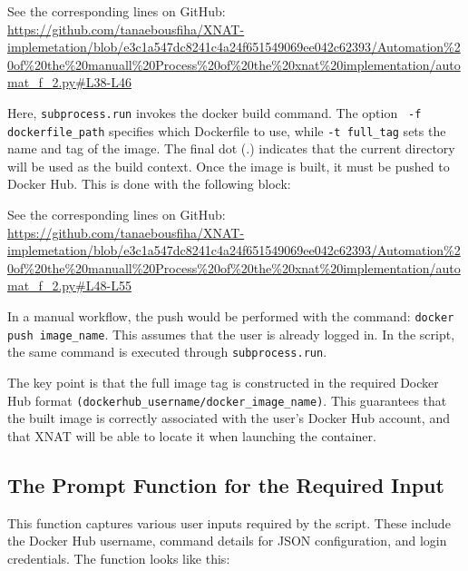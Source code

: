 

\noindent\footnotesize See the corresponding lines on GitHub:\url{ https://github.com/tanaebousfiha/XNAT-implemetation/blob/e3c1a547dc8241c4a24f651549069ee042c62393/Automation%20of%20the%20manuall%20Process%20of%20the%20xnat%20implementation/automat_f_2.py#L38-L46}







Here, \texttt{subprocess.run} invokes the docker build command. The option \texttt{ -f dockerfile\_path} specifies which Dockerfile to use, while \texttt{-t full\_tag} sets the name and tag of the image. The final dot (.) indicates that the current directory will be used as the build context.
Once the image is built, it must be pushed to Docker Hub. This is done with the following block:


\noindent\footnotesize See the corresponding lines on GitHub:\url{ https://github.com/tanaebousfiha/XNAT-implemetation/blob/e3c1a547dc8241c4a24f651549069ee042c62393/Automation%20of%20the%20manuall%20Process%20of%20the%20xnat%20implementation/automat_f_2.py#L48-L55}





In a manual workflow, the push would be performed with the command:  \texttt{docker push image\_name}. This assumes that the user is already logged in. In the script, the same command is executed through  \texttt{subprocess.run}.

The key point is that the full image tag is constructed in the required Docker Hub format \texttt{(dockerhub\_username/docker\_image\_name)}. This guarantees that the built image is correctly associated with the user’s Docker Hub account, and that XNAT will be able to locate it when launching the container.

\subsection{The Prompt Function for the Required Input}

This function captures various user inputs required by the script. These include the Docker Hub username, command details for JSON configuration, and login credentials.
The function looks like this:
 
